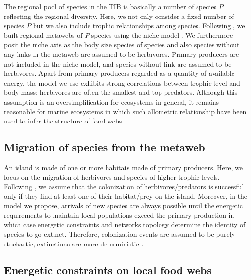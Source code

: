 The regional pool of species in the TIB is basically a number of species
\(P\) reflecting the regional diversity. Here, we not only consider a
fixed number of species \(P\) but we also include trophic relationships
among species. Following \citet{Cazelles2015a}, we built regional
metawebs of \(P\) species using the niche model \citet{Williams2000}. We
furthermore posit the niche axis as the body size species of species and
also species without any links in the metaweb are assumed to be
herbivores. Primary producers are not included in the niche model, and
species without link are assumed to be herbivores. Apart from primary
producers regarded as a quantity of available energy, the model we use
exhibits strong correlations between trophic level and body mass:
herbivores are often the smallest and top predators. Although this
assumption is an oversimplification for ecosystems in general, it
remains reasonable for marine ecosystems \citep{Trebilco2013} in which
such allometric relationship have been used to infer the structure of
food webs \citep{Gravel2013}.

\subsection{Migration of species from the
metaweb}\label{migration-of-species-from-the-metaweb}

An island is made of one or more habitats made of primary producers.
Here, we focus on the migration of herbivores and species of higher
trophic levels. Following \citet{Gravel2011}, we assume that the
colonization of herbivores/predators is successful only if they find at
least one of their habitat/prey on the island. Moreover, in the model we
propose, arrivals of new species are always possible until the energetic
requirements to maintain local populations exceed the primary production
in which case energetic constraints and networks topology determine the
identity of species to go extinct. Therefore, colonization events are
assumed to be purely stochastic, extinctions are more deterministic
\citep[this difference in stochastic nature between these fundamental
processes of biogeography has been recently supported
in][]{Cirtwill2015}.

\subsection{Energetic constraints on local food
webs}\label{energetic-constraints-on-local-food-webs}

